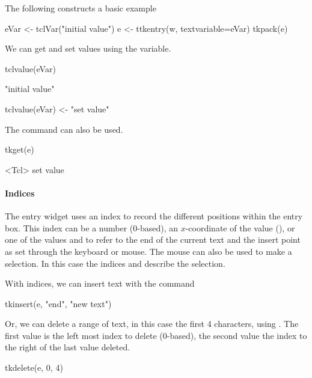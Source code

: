 The following constructs a basic example
\begin{Schunk}
\begin{Sinput}
 eVar <- tclVar("initial value")
 e <- ttkentry(w, textvariable=eVar)
 tkpack(e)
\end{Sinput}
\end{Schunk}

We can get and set values using the \TCL\/ variable.
\begin{Schunk}
\begin{Sinput}
 tclvalue(eVar)
\end{Sinput}
\begin{Soutput}
[1] "initial value"
\end{Soutput}
\begin{Sinput}
 tclvalue(eVar) <- "set value"
\end{Sinput}
\end{Schunk}

The  command can also be used.
\begin{Schunk}
\begin{Sinput}
 tkget(e)
\end{Sinput}
\begin{Soutput}
<Tcl> set value 
\end{Soutput}
\end{Schunk}

\paragraph{Indices}
The entry widget uses an index to record the different positions
within the entry box. This index can be a number (0-based), an
$x$-coordinate of the value (), or one of the values
 and  to refer to the end of the current text
and the insert point as set through the keyboard or mouse. The mouse
can also be used to make a selection. In this case the indices
 and  describe the selection.

With indices, we can insert  text with the  command
\begin{Schunk}
\begin{Sinput}
 tkinsert(e, "end", "new text")
\end{Sinput}
\end{Schunk}

Or, we can delete a range of text, in this case the first 4
characters, using . The first value is
the left most index to delete (0-based), the second value the index to
the right of the last value deleted.
\begin{Schunk}
\begin{Sinput}
 tkdelete(e, 0, 4)
\end{Sinput}
\end{Schunk}

